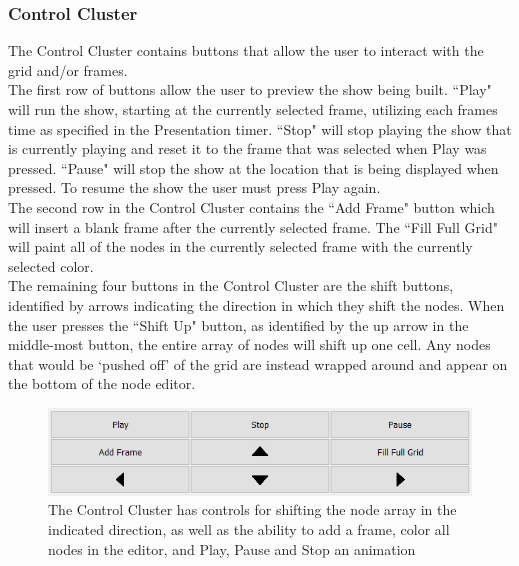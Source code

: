 \documentclass[12pt]{article}
\begin{document}
	\subsubsection {Control Cluster}
  		The Control Cluster contains buttons that allow the user to interact with the grid and/or frames. 
      \\
      The first row of buttons allow the user to preview the show being built. ``Play" will run the show, starting at the currently selected frame, utilizing each frames time as specified in the Presentation timer. ``Stop" will stop playing the show that is currently playing and reset it to the frame that was selected when Play was pressed. ``Pause" will stop the show at the location that is being displayed when pressed. To resume the show the user must press Play again.
      \\
      The second row in the Control Cluster contains the ``Add Frame" button which will insert a blank frame after the currently selected frame. The ``Fill Full Grid" will paint all of the nodes in the currently selected frame with the currently selected color.
      \\
      The remaining four buttons in the Control Cluster are the shift buttons, identified by arrows indicating the direction in which they shift the nodes. When the user presses the ``Shift Up" button, as identified by the up arrow in the middle-most button, the entire array of nodes will shift up one cell. Any nodes that would be `pushed off' of the grid are instead wrapped around and appear on the bottom of the node editor.
      
    \begin{figure}[h]
      \centering
      \includegraphics[width=.8\linewidth]{control_cluster.png}
      \caption{
        The Control Cluster has controls for shifting the node array in the indicated direction, as well as the ability to add a frame, color all nodes in the editor, and Play, Pause and Stop an animation 
      }
    \end{figure}
  
\end{document}
